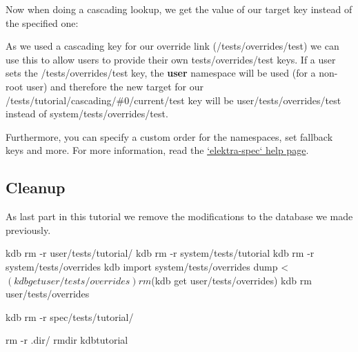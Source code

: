 

Now when doing a cascading lookup, we get the value of our target key instead of the specified one\+:




As we used a cascading key for our override link ({\ttfamily /tests/overrides/test}) we can use this to allow users to provide their own {\ttfamily tests/overrides/test} keys. If a user sets the {\ttfamily /tests/overrides/test} key, the {\bfseries user} namespace will be used (for a non-\/root user) and therefore the new target for our {\ttfamily /tests/tutorial/cascading/\#0/current/test} key will be {\ttfamily user/tests/overrides/test} instead of {\ttfamily system/tests/overrides/test}.




Furthermore, you can specify a custom order for the namespaces, set fallback keys and more. For more information, read the \hyperlink{doc_help_elektra-spec_md}{`elektra-\/spec` help page}.

\subsection*{Cleanup}

As last part in this tutorial we remove the modifications to the database we made previously.


\begin{DoxyCode}
kdb rm -r user/tests/tutorial/
kdb rm -r system/tests/tutorial
kdb rm -r system/tests/overrides
kdb import system/tests/overrides dump < $(kdb get user/tests/overrides)
rm $(kdb get user/tests/overrides)
kdb rm user/tests/overrides

kdb rm -r spec/tests/tutorial/

rm -r .dir/
rmdir kdbtutorial
\end{DoxyCode}
 